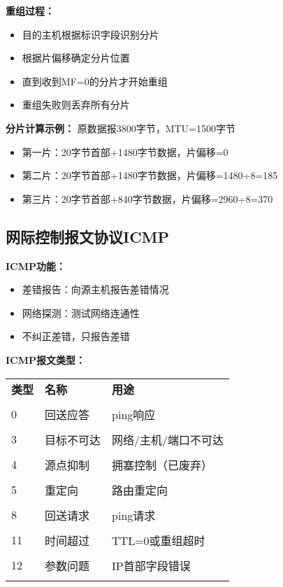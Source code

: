 \documentclass[lang=cn,newtx,10pt,scheme=chinese]{../../elegantbook}
\begin{document}
\textbf{重组过程：}
\begin{itemize}
  \item 目的主机根据标识字段识别分片
  \item 根据片偏移确定分片位置
  \item 直到收到MF=0的分片才开始重组
  \item 重组失败则丢弃所有分片
\end{itemize}

\textbf{分片计算示例：}
原数据报3800字节，MTU=1500字节
\begin{itemize}
  \item 第一片：20字节首部+1480字节数据，片偏移=0
  \item 第二片：20字节首部+1480字节数据，片偏移=1480÷8=185
  \item 第三片：20字节首部+840字节数据，片偏移=2960÷8=370
\end{itemize}

\subsection{网际控制报文协议ICMP}

\textbf{ICMP功能：}
\begin{itemize}
  \item 差错报告：向源主机报告差错情况
  \item 网络探测：测试网络连通性
  \item 不纠正差错，只报告差错
\end{itemize}

\textbf{ICMP报文类型：}
\begin{longtable}{@{}p{1cm}p{4cm}p{7cm}@{}}
\toprule
\textbf{类型} & \textbf{名称} & \textbf{用途} \\\\ \midrule
\endhead

0 & 回送应答 & ping响应 \\\\
3 & 目标不可达 & 网络/主机/端口不可达 \\\\
4 & 源点抑制 & 拥塞控制（已废弃） \\\\
5 & 重定向 & 路由重定向 \\\\
8 & 回送请求 & ping请求 \\\\
11 & 时间超过 & TTL=0或重组超时 \\\\
12 & 参数问题 & IP首部字段错误 \\\\

\bottomrule
\end{longtable}
\end{document}
